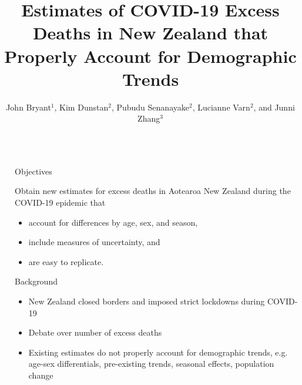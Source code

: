 \documentclass[final]{beamer}
\title{Estimates of COVID-19 Excess Deaths in New Zealand that Properly Account for Demographic Trends}
\author{John Bryant$^1$, Kim Dunstan$^2$, Pubudu Senanayake$^2$, Lucianne Varn$^2$, and Junni Zhang$^3$}
\institute{$^{1}$Bayesian Demography Limited, $^{2}$Statistics New Zealand, $^{3}$Peking University}
\newlength{\sepwid}
\newlength{\onecolwid}
\begin{document}

\setlength{\belowcaptionskip}{2ex} %
\setlength\belowdisplayshortskip{2ex} %

\begin{frame}[t] %

\begin{columns}[t] %

\begin{column}{\sepwid}\end{column} %

\begin{column}{\onecolwid} %



\begin{alertblock}{Objectives}

Obtain new estimates for excess deaths in Aotearoa New Zealand during the COVID-19 epidemic that
\begin{itemize}
\item account for differences by age, sex, and season,
\item include measures of uncertainty, and
\item are easy to replicate.
\end{itemize}

\end{alertblock}


\begin{block}{Background}

  \begin{itemize}
  \item New Zealand closed borders and imposed strict lockdowns during COVID-19
  \item Debate over number of excess deaths
  \item Existing estimates do not properly account for demographic trends, e.g.  age-sex differentials, pre-existing trends, seasonal effects, population change
 \end{itemize}


\end{block}
\end{column}
\end{columns}
\end{frame}
\end{document}
